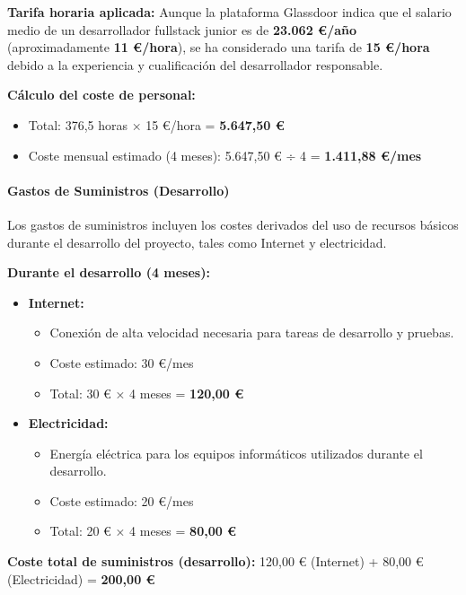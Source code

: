 \textbf{Tarifa horaria aplicada:} Aunque la plataforma Glassdoor \cite{webGlassdoor} indica que el salario medio de un desarrollador fullstack junior es de \textbf{23.062 €/año} (aproximadamente \textbf{11 €/hora}), se ha considerado una tarifa de \textbf{15 €/hora} debido a la experiencia y cualificación del desarrollador responsable.

\textbf{Cálculo del coste de personal:}
\begin{itemize}
    \item Total: 376,5 horas × 15 €/hora = \textbf{5.647,50 €}
    \item Coste mensual estimado (4 meses): 5.647,50 € ÷ 4 = \textbf{1.411,88 €/mes}
\end{itemize}

\paragraph{Gastos de Suministros (Desarrollo)}

Los gastos de suministros incluyen los costes derivados del uso de recursos básicos durante el desarrollo del proyecto, tales como Internet y electricidad.

\textbf{Durante el desarrollo (4 meses):}
\begin{itemize}
    \item \textbf{Internet:} 
    \begin{itemize}
        \item Conexión de alta velocidad necesaria para tareas de desarrollo y pruebas.
        \item Coste estimado: 30 €/mes
        \item Total: 30 € × 4 meses = \textbf{120,00 €}
    \end{itemize}
    \item \textbf{Electricidad:}
    \begin{itemize}
        \item Energía eléctrica para los equipos informáticos utilizados durante el desarrollo.
        \item Coste estimado: 20 €/mes
        \item Total: 20 € × 4 meses = \textbf{80,00 €}
    \end{itemize}
\end{itemize}

\textbf{Coste total de suministros (desarrollo):} 120,00 € (Internet) + 80,00 € (Electricidad) = \textbf{200,00 €}

